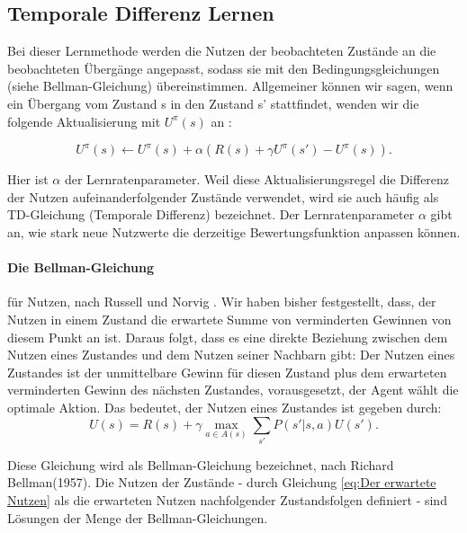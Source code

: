 \subsection{Temporale Differenz Lernen}
\label{subsec:Temporale Differenz Lernen}
Bei dieser Lernmethode werden die Nutzen der beobachteten Zustände an die beobachteten Übergänge angepasst, sodass sie mit den Bedingungsgleichungen (siehe Bellman-Gleichung) übereinstimmen. Allgemeiner können wir sagen, wenn ein Übergang vom Zustand s in den Zustand s' stattfindet, wenden wir die folgende Aktualisierung mit $U^\pi(s)$ an \cite[966\psq]{Russell}:

\begin{equation}
\label{eq:Aktualisierung temporale Differenz}
U^\pi(s) \leftarrow U^\pi(s) + \alpha(R(s) + \gamma U^\pi(s') - U^\pi(s)).
\end{equation}

Hier ist $\alpha$ der Lernratenparameter. Weil diese Aktualisierungsregel die Differenz der Nutzen aufeinanderfolgender Zustände verwendet, wird sie auch häufig als TD-Gleichung (Temporale Differenz) bezeichnet. Der Lernratenparameter $\alpha$ gibt an, wie stark neue Nutzwerte die derzeitige Bewertungsfunktion anpassen können. 

\paragraph{Die Bellman-Gleichung} für Nutzen, nach Russell und Norvig \cite[759]{Russell}. Wir haben bisher festgestellt, dass, der Nutzen in einem Zustand die erwartete Summe von verminderten Gewinnen von diesem Punkt an ist. Daraus folgt, dass es eine direkte Beziehung zwischen dem Nutzen eines Zustandes und dem Nutzen seiner Nachbarn gibt: Der Nutzen eines Zustandes ist der unmittelbare Gewinn für diesen Zustand plus dem erwarteten verminderten Gewinn des nächsten Zustandes, vorausgesetzt, der Agent wählt die optimale Aktion. Das bedeutet, der Nutzen eines Zustandes ist gegeben durch:\\

\begin{equation}
U(s) = R(s) + \gamma \max_{a \in A(s)} \sum_{s'} P(s'|s, a) U(s').
\end{equation}

Diese Gleichung wird als Bellman-Gleichung bezeichnet, nach Richard Bellman(1957). Die Nutzen der Zustände - durch Gleichung \ref{eq:Der erwartete Nutzen} als die erwarteten Nutzen nachfolgender Zustandsfolgen definiert - sind Lösungen der Menge der Bellman-Gleichungen.

